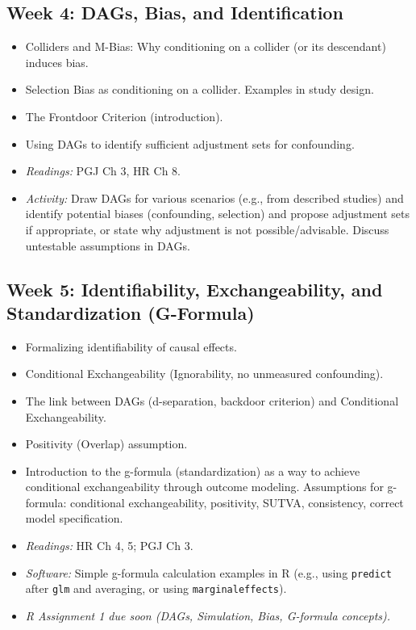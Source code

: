 \documentclass[10.5pt]{article}
\begin{document}
\subsection*{Week 4: DAGs, Bias, and Identification}
\begin{itemize}
    \item Colliders and M-Bias: Why conditioning on a collider (or its descendant) induces bias.
    \item Selection Bias as conditioning on a collider. Examples in study design.
    \item The Frontdoor Criterion (introduction).
    \item Using DAGs to identify sufficient adjustment sets for confounding.
    \item \textit{Readings:} PGJ Ch 3, HR Ch 8.
    \item \textit{Activity:} Draw DAGs for various scenarios (e.g., from described studies) and identify potential biases (confounding, selection) and propose adjustment sets if appropriate, or state why adjustment is not possible/advisable. Discuss untestable assumptions in DAGs.
\end{itemize}

\subsection*{Week 5: Identifiability, Exchangeability, and Standardization (G-Formula)}
\begin{itemize}
    \item Formalizing identifiability of causal effects.
    \item Conditional Exchangeability (Ignorability, no unmeasured confounding).
    \item The link between DAGs (d-separation, backdoor criterion) and Conditional Exchangeability.
    \item Positivity (Overlap) assumption.
    \item Introduction to the g-formula (standardization) as a way to achieve conditional exchangeability through outcome modeling. Assumptions for g-formula: conditional exchangeability, positivity, SUTVA, consistency, correct model specification.
    \item \textit{Readings:} HR Ch 4, 5; PGJ Ch 3.
    \item \textit{Software:} Simple g-formula calculation examples in R (e.g., using \texttt{predict} after \texttt{glm} and averaging, or using \texttt{marginaleffects}).
    \item \textit{R Assignment 1 due soon (DAGs, Simulation, Bias, G-formula concepts).}
\end{itemize}
\end{document}
